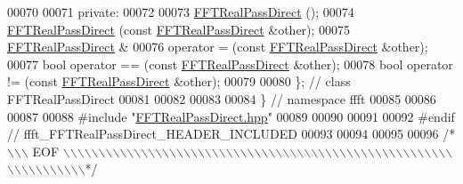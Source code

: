 \begin{DoxyCode}
00070 
00071 \textcolor{keyword}{private}:
00072 
00073                         \hyperlink{a00013}{FFTRealPassDirect} ();
00074                         \hyperlink{a00013}{FFTRealPassDirect} (\textcolor{keyword}{const} 
      \hyperlink{a00013}{FFTRealPassDirect} &other);
00075     \hyperlink{a00013}{FFTRealPassDirect} &
00076                         operator = (\textcolor{keyword}{const} \hyperlink{a00013}{FFTRealPassDirect} &other);
00077     \textcolor{keywordtype}{bool}                operator == (\textcolor{keyword}{const} \hyperlink{a00013}{FFTRealPassDirect} &other);
00078     \textcolor{keywordtype}{bool}                operator != (\textcolor{keyword}{const} \hyperlink{a00013}{FFTRealPassDirect} &other);
00079 
00080 \};  \textcolor{comment}{// class FFTRealPassDirect}
00081 
00082 
00083 
00084 \}   \textcolor{comment}{// namespace ffft}
00085 
00086 
00087 
00088 \textcolor{preprocessor}{#include    "\hyperlink{a00101}{FFTRealPassDirect.hpp}"}
00089 
00090 
00091 
00092 \textcolor{preprocessor}{#endif  // ffft\_FFTRealPassDirect\_HEADER\_INCLUDED}
00093 
00094 
00095 
00096 \textcolor{comment}{/*\(\backslash\)\(\backslash\)\(\backslash\) EOF \(\backslash\)\(\backslash\)\(\backslash\)\(\backslash\)\(\backslash\)\(\backslash\)\(\backslash\)\(\backslash\)\(\backslash\)\(\backslash\)\(\backslash\)\(\backslash\)\(\backslash\)\(\backslash\)\(\backslash\)\(\backslash\)\(\backslash\)\(\backslash\)\(\backslash\)\(\backslash\)\(\backslash\)\(\backslash\)\(\backslash\)\(\backslash\)\(\backslash\)\(\backslash\)\(\backslash\)\(\backslash\)\(\backslash\)\(\backslash\)\(\backslash\)\(\backslash\)\(\backslash\)\(\backslash\)\(\backslash\)\(\backslash\)\(\backslash\)\(\backslash\)\(\backslash\)\(\backslash\)\(\backslash\)\(\backslash\)\(\backslash\)\(\backslash\)\(\backslash\)\(\backslash\)\(\backslash\)\(\backslash\)\(\backslash\)\(\backslash\)\(\backslash\)\(\backslash\)\(\backslash\)\(\backslash\)\(\backslash\)\(\backslash\)\(\backslash\)\(\backslash\)\(\backslash\)\(\backslash\)\(\backslash\)\(\backslash\)\(\backslash\)\(\backslash\)\(\backslash\)\(\backslash\)*/}
\end{DoxyCode}
